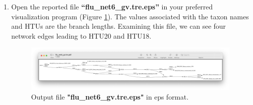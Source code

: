 \documentclass[11pt]{article}
\begin{document}
\begin {enumerate}
\item  Open the reported file \textbf{``flu\_net6\_gv.tre.eps''} in your preferred
visualization program (Figure \ref{eps6}). The values associated with the taxon 
names and HTUs are the branch lengths. Examining this file, we can see four
network edges leading to HTU20 and HTU18.

\begin{figure}[H]
\centering
\includegraphics[width=\textwidth]{eps6.png}
\caption{Output file \textbf{"flu\_net6\_gv.tre.eps"} in eps format.}
\label{eps6}
\end{figure}

\end{enumerate}


\end{document}
